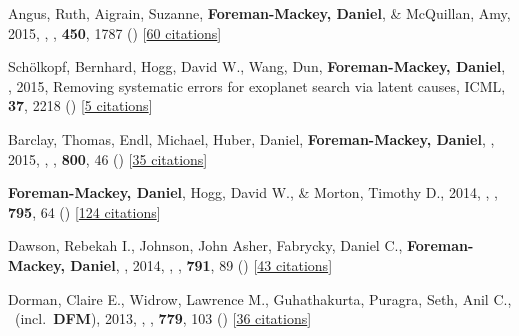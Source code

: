 \item[{\color{numcolor}\scriptsize9}] Angus, Ruth, Aigrain, Suzanne, \textbf{Foreman-Mackey, Daniel}, \& McQuillan, Amy, 2015, , \mnras, \textbf{450}, 1787 () [\href{http://adsabs.harvard.edu/abs/2015MNRAS.450.1787A}{60 citations}]

\item[{\color{numcolor}\scriptsize8}] Sch{\"o}lkopf, Bernhard, Hogg, David W., Wang, Dun, \textbf{Foreman-Mackey, Daniel}, \etal, 2015, Removing systematic errors for exoplanet search via latent causes, ICML, \textbf{37}, 2218 () [\href{https://scholar.google.com/scholar?cites=11768165421845046384}{5 citations}]

\item[{\color{numcolor}\scriptsize7}] Barclay, Thomas, Endl, Michael, Huber, Daniel, \textbf{Foreman-Mackey, Daniel}, \etal, 2015, , \apj, \textbf{800}, 46 () [\href{http://adsabs.harvard.edu/abs/2015ApJ...800...46B}{35 citations}]

\item[{\color{numcolor}\scriptsize6}] \textbf{Foreman-Mackey, Daniel}, Hogg, David W., \& Morton, Timothy D., 2014, , \apj, \textbf{795}, 64 () [\href{http://adsabs.harvard.edu/abs/2014ApJ...795...64F}{124 citations}]

\item[{\color{numcolor}\scriptsize5}] Dawson, Rebekah I., Johnson, John Asher, Fabrycky, Daniel C., \textbf{Foreman-Mackey, Daniel}, \etal, 2014, , \apj, \textbf{791}, 89 () [\href{http://adsabs.harvard.edu/abs/2014ApJ...791...89D}{43 citations}]

\item[{\color{numcolor}\scriptsize4}] Dorman, Claire E., Widrow, Lawrence M., Guhathakurta, Puragra, Seth, Anil C., \etal\ (incl.\ \textbf{DFM}), 2013, , \apj, \textbf{779}, 103 () [\href{http://adsabs.harvard.edu/abs/2013ApJ...779..103D}{36 citations}]

